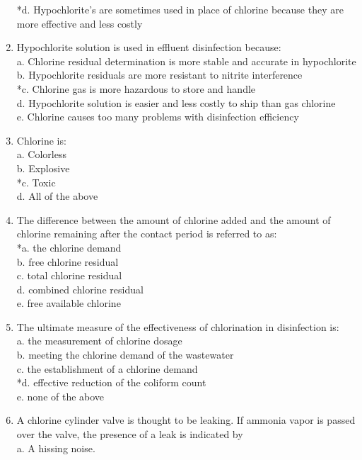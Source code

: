 \begin{enumerate}
*d. Hypochlorite’s are sometimes used in place of chlorine because they are more effective and less costly \\
\item Hypochlorite solution is used in effluent disinfection because: \\
a. Chlorine residual determination is more stable and accurate in hypochlorite \\
b. Hypochlorite residuals are more resistant to nitrite interference \\
*c. Chlorine gas is more hazardous to store and handle \\
d. Hypochlorite solution is easier and less costly to ship than gas chlorine \\
e. Chlorine causes too many problems with disinfection efficiency \\
\item Chlorine is: \\
a. Colorless \\
b. Explosive \\
*c. Toxic \\
d. All of the above \\
\item The difference between the amount of chlorine added and the amount of chlorine remaining after the contact period is referred to as: \\
*a. the chlorine demand \\
b. free chlorine residual \\
c. total chlorine residual \\
d. combined chlorine residual \\
e. free available chlorine \\
\item The ultimate measure of the effectiveness of chlorination in disinfection is: \\
a. the measurement of chlorine dosage \\
b. meeting the chlorine demand of the wastewater \\
c. the establishment of a chlorine demand \\
*d. effective reduction of the coliform count \\
e. none of the above \\
\item A chlorine cylinder valve is thought to be leaking. If ammonia vapor is passed over the valve, the presence of a leak is indicated by \\
a. A hissing noise. \\

\end{enumerate}
